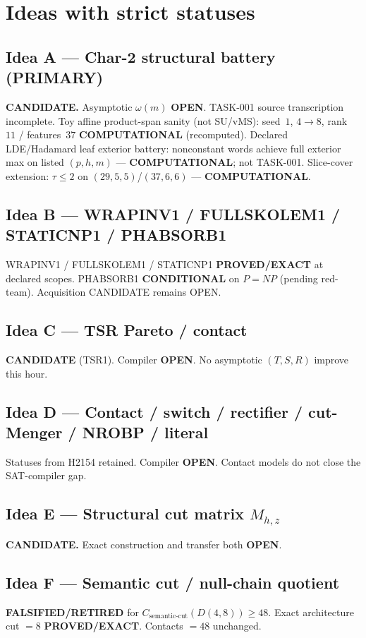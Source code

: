 \documentclass[11pt]{article}
\begin{document}
\section*{Ideas with strict statuses}
\subsection*{Idea A --- Char-2 structural battery (PRIMARY)}
\textbf{CANDIDATE.} Asymptotic $\omega(m)$ \textbf{OPEN}. TASK-001 source transcription incomplete.
Toy affine product-span sanity (not SU/vMS): seed~$1$, $4\to8$, rank~$11$ / features~$37$
\textbf{COMPUTATIONAL} (recomputed).
Declared LDE/Hadamard leaf exterior battery: nonconstant words achieve full exterior max on
listed $(p,h,m)$ --- \textbf{COMPUTATIONAL}; not TASK-001.
Slice-cover extension: $\tau{\le}2$ on $(29,5,5)$/$(37,6,6)$ --- \textbf{COMPUTATIONAL}.

\subsection*{Idea B --- WRAPINV1 / FULLSKOLEM1 / STATICNP1 / PHABSORB1}
WRAPINV1 / FULLSKOLEM1 / STATICNP1 \textbf{PROVED/EXACT} at declared scopes.
PHABSORB1 \textbf{CONDITIONAL} on $P=NP$ (pending red-team). Acquisition CANDIDATE remains OPEN.

\subsection*{Idea C --- TSR Pareto / contact}
\textbf{CANDIDATE} (TSR1). Compiler \textbf{OPEN}. No asymptotic $(T,S,R)$ improve this hour.

\subsection*{Idea D --- Contact / switch / rectifier / cut-Menger / NROBP / literal}
Statuses from H2154 retained. Compiler \textbf{OPEN}. Contact models do not close the SAT-compiler gap.

\subsection*{Idea E --- Structural cut matrix $M_{h,z}$}
\textbf{CANDIDATE.} Exact construction and transfer both \textbf{OPEN}.

\subsection*{Idea F --- Semantic cut / null-chain quotient}
\textbf{FALSIFIED/RETIRED} for $C_{\mathrm{semantic\textrm{-}cut}}(D(4,8))\ge48$.
Exact architecture cut $=8$ \textbf{PROVED/EXACT}. Contacts $=48$ unchanged.
\end{document}
